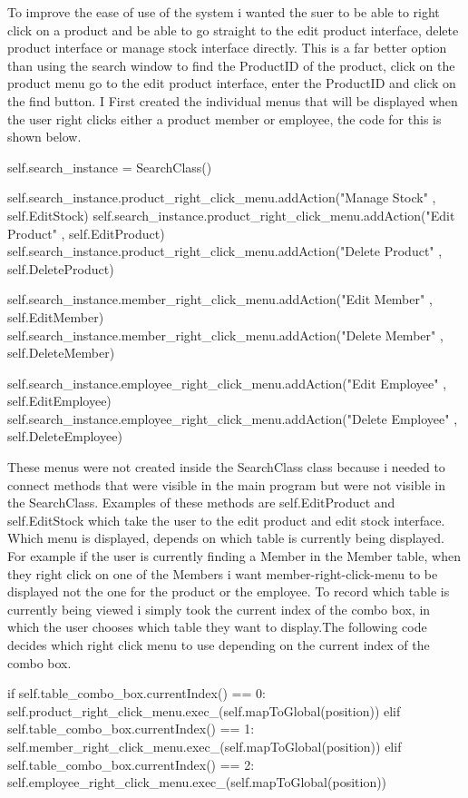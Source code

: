To improve the ease of use of the system i wanted the suer to be able to right click on a product and be able to go straight to the edit product interface, delete product interface or manage stock interface directly. This is a far better option than using the search window to find the ProductID of the product, click on the product menu go to the edit product interface, enter the ProductID and click on the find button. I First created the individual menus that will be displayed when the user right clicks either a product member or employee, the code for this is shown below.

\begin{python}

self.search_instance = SearchClass()
        
self.search_instance.product_right_click_menu.addAction("Manage Stock" , self.EditStock)
self.search_instance.product_right_click_menu.addAction("Edit Product" , self.EditProduct)
self.search_instance.product_right_click_menu.addAction("Delete Product" , self.DeleteProduct)

self.search_instance.member_right_click_menu.addAction("Edit Member" , self.EditMember)
self.search_instance.member_right_click_menu.addAction("Delete Member" , self.DeleteMember)

self.search_instance.employee_right_click_menu.addAction("Edit Employee" , self.EditEmployee)
self.search_instance.employee_right_click_menu.addAction("Delete Employee" , self.DeleteEmployee)

\end{python}

These menus were not created inside the SearchClass class because i needed to connect methods that were visible in the main program but were not visible in the SearchClass. Examples of these methods are self.EditProduct and self.EditStock which take the user to the edit product and edit stock interface. Which menu is displayed, depends on which table is currently being displayed. For example if the user is currently finding a Member in the Member table, when they right click on one of the Members i want member-right-click-menu to be displayed not the one for the product or the employee. To record which table is currently being viewed i simply took the current index of the combo box, in which the user chooses which table they want to display.The following code decides which right click menu to use depending on the current index of the combo box.

\begin{python}
 if self.table_combo_box.currentIndex() == 0:
	 self.product_right_click_menu.exec_(self.mapToGlobal(position))
 elif self.table_combo_box.currentIndex() == 1:
	self.member_right_click_menu.exec_(self.mapToGlobal(position))
elif self.table_combo_box.currentIndex() == 2:
	self.employee_right_click_menu.exec_(self.mapToGlobal(position))
\end{python}

